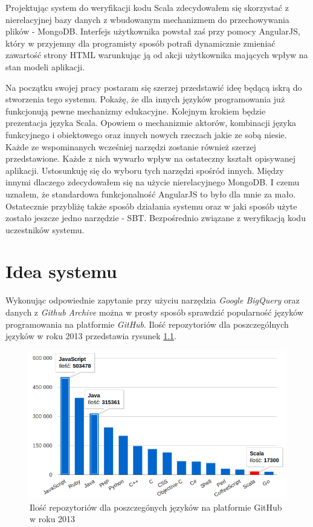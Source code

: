 \documentclass[brudnopis]{xmgr}
\begin{document}
Projektując system do weryfikacji kodu Scala zdecydowałem się skorzystać z nierelacyjnej bazy danych z wbudowanym mechanizmem do przechowywania plików - MongoDB. Interfejs użytkownika powstał zaś przy pomocy AngularJS, który w przyjemny dla programisty sposób  potrafi dynamicznie zmieniać zawartość strony HTML warunkując ją od akcji użytkownika mających wpływ na stan modeli aplikacji.

\medskip Na początku swojej pracy postaram się szerzej przedstawić ideę będącą iskrą do stworzenia tego systemu. Pokażę, że dla innych języków programowania już funkcjonują pewne mechanizmy edukacyjne. Kolejnym krokiem będzie prezentacja języka Scala. Opowiem o mechanizmie aktorów, kombinacji języka funkcyjnego i obiektowego oraz innych nowych rzeczach jakie ze sobą niesie. Każde ze wspominanych wcześniej narzędzi zostanie również szerzej przedstawione. Każde z nich wywarło wpływ na ostateczny kształt opisywanej aplikacji. Ustosunkuję się do wyboru tych narzędzi spośród innych. Między innymi dlaczego zdecydowałem się na użycie nierelacyjnego MongoDB. I czemu uznałem, że standardowa funkcjonalność AngularJS to było dla mnie za mało. Ostatecznie przybliżę także sposób działania systemu oraz w jaki sposób użyte zostało jeszcze jedno narzędzie - SBT. Bezpośrednio związane z weryfikacją kodu uczestników systemu. 

\chapter{Idea systemu}

Wykonując odpowiednie zapytanie przy użyciu narzędzia \textit{Google BigQuery} oraz danych z \textit{Github Archive} można w prosty sposób sprawdzić popularność języków programowania na platformie \textit{GitHub}. Ilość repozytoriów dla poszczególnych języków w roku 2013  przedstawia rysunek \ref{RYS.1}. 

\begin{figure}[!tbh]
\centering 
\includegraphics[width=.95\hsize]{fig/top_github_languages_2013}
\caption{Ilość repozytoriów dla poszczegónych języków na platformie GitHub w roku 2013 \label{RYS.1}}
\end{figure}
\end{document}
